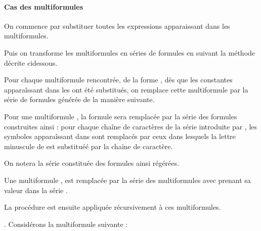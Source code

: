 \documentclass[letterpaper,10pt,french]{sphinxmanual}
\begin{document}
\paragraph{Cas des multi\sphinxhyphen{}formules}
\label{\detokenize{mlang:cas-des-multi-formules}}
\sphinxAtStartPar
On commence par substituer toutes les expressions  apparaissant dans
les multi\sphinxhyphen{}formules.

\sphinxAtStartPar
Puis on transforme les multi\sphinxhyphen{}formules en séries de formules en suivant la
méthode décrite ci\sphinxhyphen{}dessous.

\sphinxAtStartPar
Pour chaque multi\sphinxhyphen{}formule rencontrée, de la forme ,
dès que les constantes apparaîssant dans les  ont été substitués, on
remplace cette multi\sphinxhyphen{}formule par la série de formules générée de la manière
suivante.

\sphinxAtStartPar
Pour une multi\sphinxhyphen{}formule , la
formule  sera remplacée par la série des formules construites ainsi : pour
chaque chaîne de caractères de la série introduite par , les symboles
apparaîssant dans  sont remplacés par ceux dans lesquels la lettre
minuscule de  est substituéé par la chaïne de caractère.

\sphinxAtStartPar
On notera  la série constituée des formules ainsi régérées.

\sphinxAtStartPar
Une multi\sphinxhyphen{}formule ,
est remplacée par la série des multi\sphinxhyphen{}formules
 avec  prenant sa valeur
dans la série .

\sphinxAtStartPar
La procédure est ensuite appliquée récursivement
à ces multi\sphinxhyphen{}formules.

\sphinxAtStartPar
{}. Considérons la multi\sphinxhyphen{}formule suivante :
\end{document}
